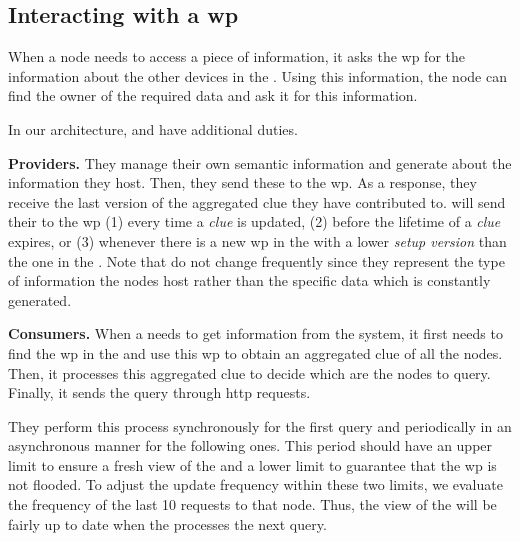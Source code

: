 \subsection{Interacting with a \acl{wp}}
\label{sec:interacting}
When a node needs to access a piece of information, it asks the \ac{wp} for the information about the other devices in the \Space{}.
Using this information, the node can find the owner of the required data and ask it for this information.

In our architecture, \providers{} and \consumers{} have additional duties.

\noindent\textbf{Providers.}
They manage their own semantic information and generate \clues{} about the information they host.
Then, they send these \clues{} to the \Space{} \ac{wp}.
As a response, they receive the last version of the aggregated clue they have contributed to.
\providers{} will send their \clues{} to the \ac{wp}
(1) every time a \emph{clue} is updated,
(2) before the lifetime of a \emph{clue} expires, or
(3) whenever there is a new \ac{wp} in the \Space{} with a lower \emph{setup version} than the one in the \provider{}.
Note that \clues{} do not change frequently since they represent the type of information the nodes host rather than the specific data which is constantly generated.

\noindent\textbf{Consumers.}
When a \consumer{} needs to get information from the system, it first needs to find the \ac{wp} in the \Space{} and use this \ac{wp} to obtain an aggregated clue of all the nodes.
Then, it processes this aggregated clue to decide which are the nodes to query.
Finally, it sends the query through \acs{http} requests.

They perform this process synchronously for the first query and periodically in an asynchronous manner for the following ones.
This period should have an upper limit to ensure a fresh view of the \Space{} and a lower limit to guarantee that the \ac{wp} is not flooded.
To adjust the update frequency within these two limits, we evaluate the frequency of the last 10 requests to that node.
Thus, the view of the \Space{} will be fairly up to date when the \consumer{} processes the next query.

